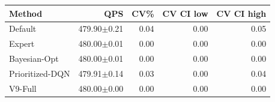 \begin{tabular}{lrrrr}
\hline
Method & QPS & CV\% & CV CI low & CV CI high \\
\hline
Default & 479.90$\pm$0.21 & 0.04 & 0.00 & 0.05 \\
Expert & 480.00$\pm$0.01 & 0.00 & 0.00 & 0.00 \\
Bayesian-Opt & 480.00$\pm$0.01 & 0.00 & 0.00 & 0.00 \\
Prioritized-DQN & 479.91$\pm$0.14 & 0.03 & 0.00 & 0.04 \\
V9-Full & 480.00$\pm$0.00 & 0.00 & 0.00 & 0.00 \\
\hline
\end{tabular}
